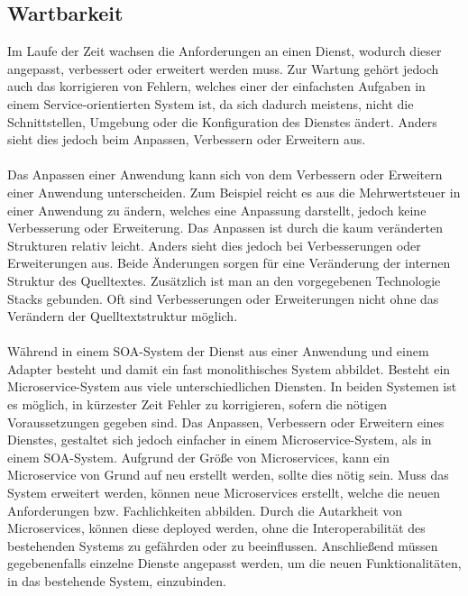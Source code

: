 \subsection{Wartbarkeit}
\label{subsec:Wartbarkeit}
Im Laufe der Zeit wachsen die Anforderungen an einen Dienst, wodurch dieser angepasst, verbessert oder erweitert werden muss. Zur Wartung gehört jedoch auch das korrigieren von Fehlern, welches einer der einfachsten Aufgaben in einem Service-orientierten System ist, da sich dadurch meistens, nicht die Schnittstellen, Umgebung oder die Konfiguration des Dienstes ändert. Anders sieht dies jedoch beim Anpassen, Verbessern oder Erweitern aus.
\\\\
Das Anpassen einer Anwendung kann sich von dem Verbessern oder Erweitern einer Anwendung unterscheiden. Zum Beispiel reicht es aus die Mehrwertsteuer in einer Anwendung zu ändern, welches eine Anpassung darstellt, jedoch keine Verbesserung oder Erweiterung. Das Anpassen ist durch die kaum veränderten Strukturen relativ leicht. Anders sieht dies jedoch bei Verbesserungen oder Erweiterungen aus. Beide Änderungen sorgen für eine Veränderung der internen Struktur des Quelltextes. Zusätzlich ist man an den vorgegebenen Technologie Stacks gebunden. Oft sind Verbesserungen oder Erweiterungen nicht ohne das Verändern der Quelltextstruktur möglich.
\\\\
Während in einem SOA-System der Dienst aus einer Anwendung und einem Adapter besteht und damit ein fast monolithisches System abbildet. Besteht ein Microservice-System aus viele unterschiedlichen Diensten. In beiden Systemen ist es möglich, in kürzester Zeit Fehler zu korrigieren, sofern die nötigen Voraussetzungen gegeben sind. Das Anpassen, Verbessern oder Erweitern eines Dienstes, gestaltet sich jedoch einfacher in einem Microservice-System, als in einem SOA-System. Aufgrund der Größe von Microservices, kann ein Microservice von Grund auf neu erstellt werden, sollte dies nötig sein. Muss das System erweitert werden, können neue Microservices erstellt, welche die neuen Anforderungen bzw. Fachlichkeiten abbilden. Durch die Autarkheit von Microservices, können diese deployed werden, ohne die Interoperabilität des bestehenden Systems zu gefährden oder zu beeinflussen. Anschließend müssen gegebenenfalls einzelne Dienste angepasst werden, um die neuen Funktionalitäten, in das bestehende System, einzubinden.

